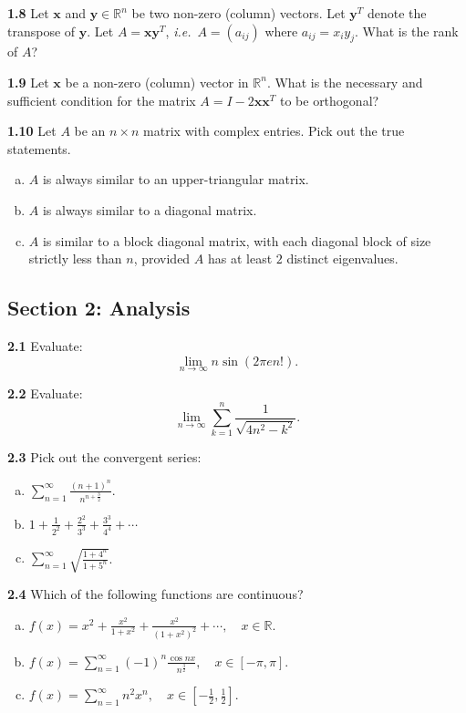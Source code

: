 \documentclass[11pt,a4paper]{article}
\newcommand{\R}{\mathbb{R}}
\newcommand{\examsec}[1]{%
  \subsection*{#1}
  \vspace{-2pt}
}
\newcommand{\qitem}[1]{\par\medskip\noindent\textbf{#1}\hspace{0.5em}}
\begin{document}
\qitem{1.8} Let $\mathbf{x}$ and $\mathbf{y} \in \R^n$ be two non-zero (column) vectors. Let $\mathbf{y}^T$ denote the transpose of $\mathbf{y}$. Let $A = \mathbf{x}\mathbf{y}^T$, \emph{i.e.}\ $A = (a_{ij})$ where $a_{ij} = x_i y_j$. What is the rank of $A$?

\qitem{1.9} Let $\mathbf{x}$ be a non-zero (column) vector in $\R^n$. What is the necessary and sufficient condition for the matrix $A = I - 2\mathbf{x}\mathbf{x}^T$ to be orthogonal?

\qitem{1.10} Let $A$ be an $n \times n$ matrix with complex entries. Pick out the true statements.
\begin{enumerate}[(a)]
  \item $A$ is always similar to an upper-triangular matrix.
  \item $A$ is always similar to a diagonal matrix.
  \item $A$ is similar to a block diagonal matrix, with each diagonal block of size strictly less than $n$, provided $A$ has at least $2$ distinct eigenvalues.
\end{enumerate}

\examsec{Section 2: Analysis}

\qitem{2.1} Evaluate:
\[
  \lim_{n \to \infty} n\sin(2\pi e n!).
\]

\qitem{2.2} Evaluate:
\[
  \lim_{n \to \infty} \sum_{k=1}^{n} \frac{1}{\sqrt{4n^2 - k^2}}.
\]

\qitem{2.3} Pick out the convergent series:
\begin{enumerate}[(a)]
  \item $\displaystyle\sum_{n=1}^{\infty} \frac{(n+1)^n}{n^{n + \frac{3}{2}}}$.
  \item $\displaystyle 1 + \frac{1}{2^2} + \frac{2^2}{3^3} + \frac{3^3}{4^4} + \cdots$
  \item $\displaystyle\sum_{n=1}^{\infty} \sqrt{\frac{1 + 4^n}{1 + 5^n}}$.
\end{enumerate}

\qitem{2.4} Which of the following functions are continuous?
\begin{enumerate}[(a)]
  \item $\displaystyle f(x) = x^2 + \frac{x^2}{1+x^2} + \frac{x^2}{(1+x^2)^2} + \cdots,\quad x \in \R$.
  \item $\displaystyle f(x) = \sum_{n=1}^{\infty} (-1)^n \frac{\cos nx}{n^{\frac{3}{2}}},\quad x \in [-\pi, \pi]$.
  \item $\displaystyle f(x) = \sum_{n=1}^{\infty} n^2 x^n,\quad x \in \left[-\frac{1}{2}, \frac{1}{2}\right]$.
\end{enumerate}
\end{document}
